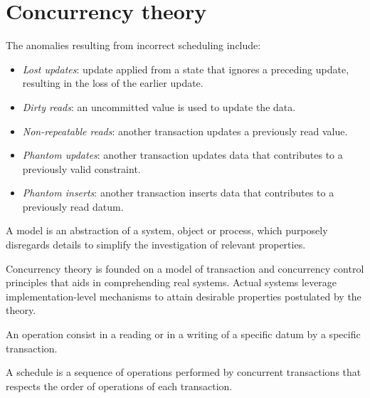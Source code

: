 \section{Concurrency theory}

The anomalies resulting from incorrect scheduling include: 
\begin{itemize}
    \item \textit{Lost updates}: update applied from a state that ignores a preceding update, resulting in the loss of the earlier update.
    \item \textit{Dirty reads}: an uncommitted value is used to update the data.
    \item \textit{Non-repeatable reads}: another transaction updates a previously read value.
    \item \textit{Phantom updates}: another transaction updates data that contributes to a previously valid constraint.
    \item \textit{Phantom inserts}: another transaction inserts data that contributes to a previously read datum.
\end{itemize}

\begin{definition}
    A model is an abstraction of a system, object or process, which purposely disregards details to simplify the investigation of relevant properties. 
\end{definition}
Concurrency theory is founded on a model of transaction and concurrency control principles that aids in comprehending real systems.
Actual systems leverage implementation-level mechanisms to attain desirable properties postulated by the theory.
\begin{definition}
    An operation consist in a reading or in a writing of a specific datum by a specific transaction. 
\end{definition}
\begin{definition}
    A schedule is a sequence of operations performed by concurrent transactions that respects the order of operations of each transaction. 
\end{definition}

